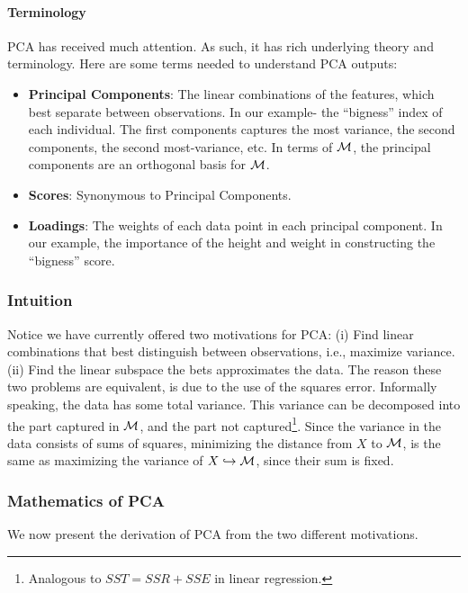 \paragraph{Terminology}
PCA has received much attention. As such, it has rich underlying theory and terminology.
Here are some terms needed to understand PCA outputs:
\begin{itemize}
\item \textbf{Principal Components}:  The linear combinations of the features, which best separate between observations. In our example- the ``bigness'' index of each individual. The first components captures the most variance, the second components, the second most-variance, etc. In terms of $\mathcal{M}$, the principal components are an orthogonal basis for $\mathcal{M}$.
\item \textbf{Scores}: Synonymous to Principal Components.
\item \textbf{Loadings}: The weights of each data point in each principal component. In our example, the importance of the height and weight in constructing the ``bigness'' score.
\end{itemize}


\subsubsection{Intuition}
\label{sec:pca_intuition}

Notice we have currently offered two motivations for PCA: 
(i) Find linear combinations that best distinguish between observations, i.e., maximize variance. 
(ii) Find the linear subspace the bets approximates the data.
The reason these two problems are equivalent, is due to the use of the squares error.
Informally speaking, the data has some total variance. This variance can be decomposed into the part captured in $\mathcal{M}$, and the part not captured\footnote{Analogous to $SST=SSR+SSE$ in linear regression.}. 
Since the variance in the data consists of sums of squares, minimizing the distance from $X$ to $\mathcal{M}$, is the same as maximizing the variance of $X \hookrightarrow \mathcal{M}$, since their sum is fixed.



\subsubsection{Mathematics of PCA}
\label{sec:pca_mathematics}
We now present the derivation of PCA from the two different motivations.




